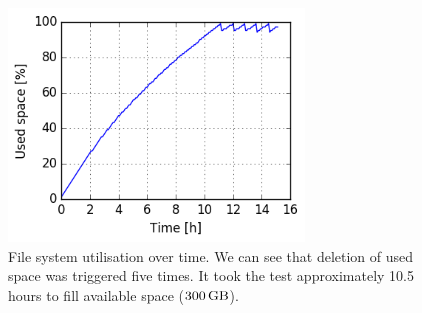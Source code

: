 \documentclass[
  color, %
  table, %
  lof,   %
  lot,   %
]{fithesis3}
\begin{document}
\begin{figure}[!h]
    \begin{minipage}{\textwidth}
        \centering
        \includegraphics[width=0.7\textwidth]{../charts/HDD_xfs/300.png}
        \caption[Usage of available space of XFS during testing of high utilisation of HDD]{File system utilisation over time. We can see that deletion of used space was triggered five times. It took the test approximately 10.5 hours to fill available space ($\SI{300}{\giga\byte}$).}
\label{fig:usage99_xfs}
    \end{minipage}
\end{figure}
\end{document}
